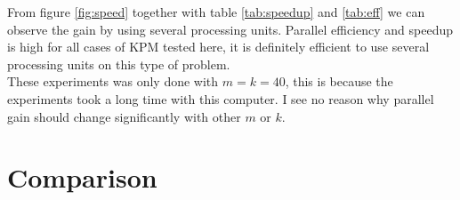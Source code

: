 From figure \ref{fig:speed} together with table \ref{tab:speedup} and \ref{tab:eff} we can observe the gain by using several processing units. Parallel efficiency and speedup is high for all cases of KPM tested here, it is definitely efficient to use several processing units on this type of problem. \\%

These experiments was only done with $m = k = 40$, this is because the experiments took a long time with this computer. I see no reason why parallel gain should change significantly with other $m$ or $k$. 

\section{Comparison} \label{sec:compare}

